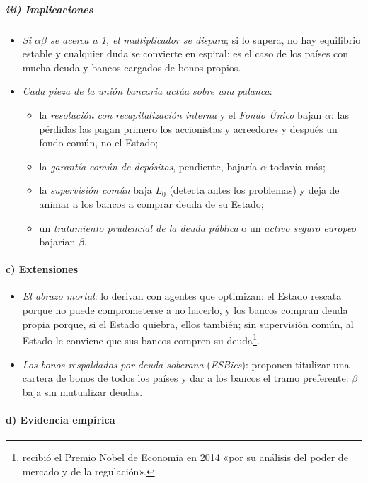 \documentclass[11pt]{article}
\begin{document}
\subparagraph{iii) Implicaciones}

\begin{itemize}
\item \emph{Si $\alpha\beta$ se acerca a 1, el multiplicador se dispara}; si lo supera, no hay equilibrio estable y cualquier duda se convierte en espiral: es el caso de los países con mucha deuda y bancos cargados de bonos propios.
\item \emph{Cada pieza de la unión bancaria actúa sobre una palanca}:
  \begin{itemize}
  \item la \emph{resolución con recapitalización interna} y el \emph{Fondo Único} bajan $\alpha$: las pérdidas las pagan primero los accionistas y acreedores y después un fondo común, no el Estado;
  \item la \emph{garantía común de depósitos}, pendiente, bajaría $\alpha$ todavía más;
  \item la \emph{supervisión común} baja $L_0$ (detecta antes los problemas) y deja de animar a los bancos a comprar deuda de su Estado;
  \item un \emph{tratamiento prudencial de la deuda pública} o un \emph{activo seguro europeo} bajarían $\beta$.
  \end{itemize}
\end{itemize}

\paragraph{c) Extensiones}

\begin{itemize}
\item \emph{El abrazo mortal}: \textcite{FarhiTirole2018} lo derivan con agentes que optimizan: el Estado rescata porque no puede comprometerse a no hacerlo, y los bancos compran deuda propia porque, si el Estado quiebra, ellos también; sin supervisión común, al Estado le conviene que sus bancos compren su deuda\footnote{ recibió el Premio Nobel de Economía en 2014 «por su análisis del poder de mercado y de la regulación»\nocite{Nobel2014Tirole}.}.
\item \emph{Los bonos respaldados por deuda soberana} (\emph{ESBies}): \textcite{BrunnermeierEtAl2016} proponen titulizar una cartera de bonos de todos los países y dar a los bancos el tramo preferente: $\beta$ baja sin mutualizar deudas.
\end{itemize}

\paragraph{d) Evidencia empírica}
\end{document}
